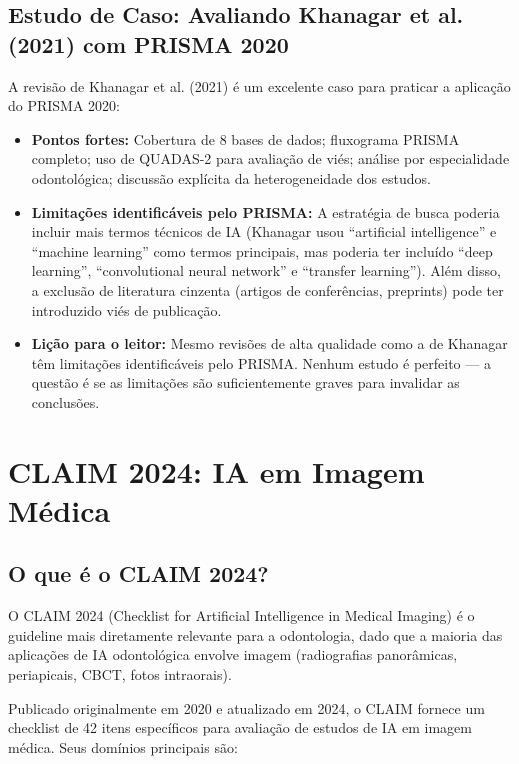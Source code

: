 \subsection{Estudo de Caso: Avaliando Khanagar et al. (2021) com PRISMA 2020}

A revisão de Khanagar et al. (2021) \cite{ODT-001} é um excelente caso para praticar a aplicação do PRISMA 2020:

\begin{itemize}
    \item \textbf{Pontos fortes:} Cobertura de 8 bases de dados; fluxograma PRISMA completo; uso de QUADAS-2 para avaliação de viés; análise por especialidade odontológica; discussão explícita da heterogeneidade dos estudos.
    \item \textbf{Limitações identificáveis pelo PRISMA:} A estratégia de busca poderia incluir mais termos técnicos de IA (Khanagar usou ``artificial intelligence'' e ``machine learning'' como termos principais, mas poderia ter incluído ``deep learning'', ``convolutional neural network'' e ``transfer learning''). Além disso, a exclusão de literatura cinzenta (artigos de conferências, preprints) pode ter introduzido viés de publicação.
    \item \textbf{Lição para o leitor:} Mesmo revisões de alta qualidade como a de Khanagar têm limitações identificáveis pelo PRISMA. Nenhum estudo é perfeito — a questão é se as limitações são suficientemente graves para invalidar as conclusões.
\end{itemize}

\section{CLAIM 2024: IA em Imagem Médica}

\subsection{O que é o CLAIM 2024?}

O CLAIM 2024 (Checklist for Artificial Intelligence in Medical Imaging)  é o guideline mais diretamente relevante para a odontologia, dado que a maioria das aplicações de IA odontológica envolve imagem (radiografias panorâmicas, periapicais, CBCT, fotos intraorais).

Publicado originalmente em 2020 e atualizado em 2024, o CLAIM fornece um checklist de 42 itens específicos para avaliação de estudos de IA em imagem médica. Seus domínios principais são:

